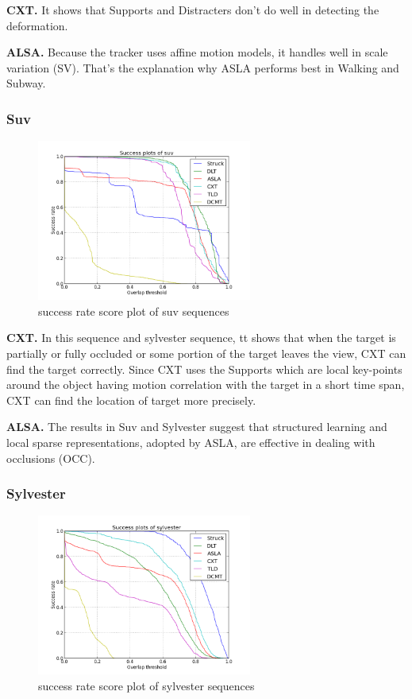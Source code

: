\documentclass{acm_proc_article-sp}
\begin{document}
\textbf{CXT.} It shows that Supports and Distracters don't do well in detecting the deformation.

\textbf{ALSA.} Because the tracker uses affine motion models, it handles well in scale variation (SV). That’s the explanation why ASLA performs best in Walking and Subway. 

\subsubsection{Suv}

\begin{figure}[hbt]
    \includegraphics[width=200pt]{suv}
    \caption{success rate score plot of suv sequences}
    \label{fig:suv}
\end{figure}

\textbf{CXT.} In this sequence and sylvester sequence, tt shows that when the target is partially or fully occluded or some portion of the target leaves the view, CXT can find the target correctly. Since CXT uses the Supports which are local key-points around the object having motion correlation with the target in a short time span, CXT can find the location of target more precisely.

\textbf{ALSA.} The results in Suv and Sylvester suggest that structured learning and local sparse representations, adopted by ASLA, are effective in dealing with occlusions (OCC).

\subsubsection{Sylvester}

\begin{figure}[hbt]
    \includegraphics[width=200pt]{sylvester}
    \caption{success rate score plot of sylvester sequences}
    \label{fig:sylvester}
\end{figure}
\end{document}

